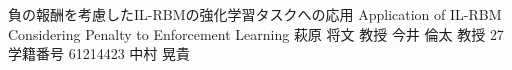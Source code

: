 \documentclass[final,a4j,12pt]{jreport}
\begin{document}
\begin{titlepage}
\thesis
{負の報酬を考慮したIL-RBMの強化学習タスクへの応用}
{Application of IL-RBM Considering Penalty to Enforcement Learning}
{萩原 将文 教授}
{今井 倫太 教授}
{27}
{学籍番号 61214423}
{中村 晃貴}
\end{titlepage}
\contents
{}



%
%
%
%
%
%


%



\appendix


%
\end{document}
